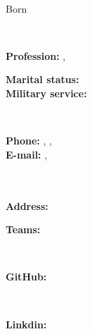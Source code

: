 \documentclass{./../../../../src/latex/classes/curriculumVitae}
\begin{document}
\iftoggle{Dev}{\par}{}
\noindent\parbox{56mm}
{\parbox{56mm}{\centering\Huge\bfseries\color{cyan}\fullName}\\\parbox{56mm}{\centering Born \bornData}}\parbox{2mm}{\ }\parbox{132mm}
{\textbf{Profession:} \ProfessionI, \ProfessionII\\\parbox{40mm}
{\textbf{Marital status:} \maritalStatus\\\textbf{Military service:} \militaryService}\parbox{2mm}{\ }\parbox{90mm}
{\textbf{Phone:} \mobilePhoneI, \mobilePhoneII, \phoneNumber\\\textbf{E-mail:} \emailI, \emailII}}\\\\
\textbf{Address:} \fullAddress\\
\parbox{46mm}{\textbf{Teams:} \skype}\parbox{2mm}{\ }\parbox{66mm}{\textbf{GitHub:} \gitHub}\parbox{2mm}{\ }\parbox{74mm}{\textbf{Linkdin:} \linkedin}

\descriptions

\education

\workExperience

\teaching

\project

\publication

\LicensesCertifications

\honorsAwards

\training

\languageS

\craft

\voluntary
\end{document}
